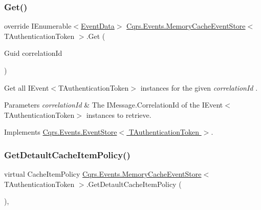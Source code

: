 \subsubsection{\texorpdfstring{Get()}{Get()}\hspace{0.1cm}{\footnotesize\ttfamily [2/2]}}
{\footnotesize\ttfamily override I\+Enumerable$<$\hyperlink{classCqrs_1_1Events_1_1EventData}{Event\+Data}$>$ \hyperlink{classCqrs_1_1Events_1_1MemoryCacheEventStore}{Cqrs.\+Events.\+Memory\+Cache\+Event\+Store}$<$ T\+Authentication\+Token $>$.Get (\begin{DoxyParamCaption}\item[{Guid}]{correlation\+Id }\end{DoxyParamCaption})\hspace{0.3cm}{\ttfamily [virtual]}}



Get all I\+Event$<$\+T\+Authentication\+Token$>$ instances for the given {\itshape correlation\+Id} . 


\begin{DoxyParams}{Parameters}
{\em correlation\+Id} & The I\+Message.\+Correlation\+Id of the I\+Event$<$\+T\+Authentication\+Token$>$ instances to retrieve.\\
\hline
\end{DoxyParams}


Implements \hyperlink{classCqrs_1_1Events_1_1EventStore_a0096646f5dff730b0041b9469719c420_a0096646f5dff730b0041b9469719c420}{Cqrs.\+Events.\+Event\+Store$<$ T\+Authentication\+Token $>$}.

\mbox{\label{classCqrs_1_1Events_1_1MemoryCacheEventStore_a2dddf1e1c4c737ad393655ee990953b3_a2dddf1e1c4c737ad393655ee990953b3}} 
\subsubsection{\texorpdfstring{Get\+Detault\+Cache\+Item\+Policy()}{GetDetaultCacheItemPolicy()}}
{\footnotesize\ttfamily virtual Cache\+Item\+Policy \hyperlink{classCqrs_1_1Events_1_1MemoryCacheEventStore}{Cqrs.\+Events.\+Memory\+Cache\+Event\+Store}$<$ T\+Authentication\+Token $>$.Get\+Detault\+Cache\+Item\+Policy (\begin{DoxyParamCaption}{ }\end{DoxyParamCaption})\hspace{0.3cm}{\ttfamily [protected]}, {\ttfamily [virtual]}}




